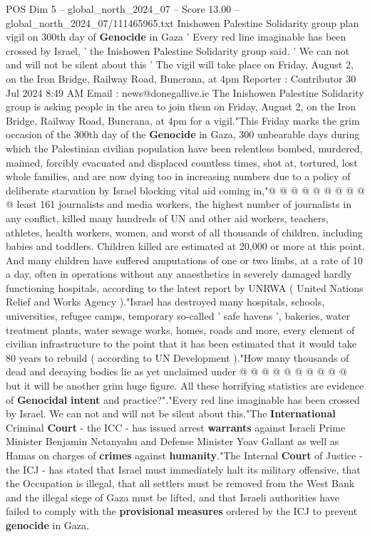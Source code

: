 \begin{textsample}{POS Dim 5 – global\_north\_2024\_07 – Score 13.00 – global\_north\_2024\_07/111465965.txt}  \label{ex:f5_pos_306}
Inishowen Palestine Solidarity group plan vigil on 300th day of \textbf{Genocide} in Gaza ' Every red line imaginable has been crossed by Israel, ' the Inishowen Palestine Solidarity group said. ' We can not and will not be silent about this ' The vigil will take place on Friday, August 2, on the Iron Bridge, Railway Road, Buncrana, at 4pm Reporter : Contributor 30 Jul 2024 8:49 AM Email : news@donegallive.ie The Inishowen Palestine Solidarity group is asking people in the area to join them on Friday, August 2, on the Iron Bridge, Railway Road, Buncrana, at 4pm for a vigil."This Friday marks the grim occasion of the 300th day of the \textbf{Genocide} in Gaza, 300 unbearable days during which the Palestinian civilian population have been relentless bombed, murdered, maimed, forcibly evacuated and displaced countless times, shot at, tortured, lost whole families, and are now dying too in increasing numbers due to a policy of deliberate starvation by Israel blocking vital aid coming in,"@ @ @ @ @ @ @ @ @ @ least 161 journalists and media workers, the highest number of journalists in any conflict, killed many hundreds of UN and other aid workers, teachers, athletes, health workers, women, and worst of all thousands of children, including babies and toddlers.
Children killed are estimated at 20,000 or more at this point.
And many children have suffered amputations of one or two limbs, at a rate of 10 a day, often in operations without any anaesthetics in severely damaged hardly functioning hospitals, according to the latest report by UNRWA ( United Nations Relief and Works Agency )."Israel has destroyed many hospitals, schools, universities, refugee camps, temporary so-called ' safe havens ', bakeries, water treatment plants, water sewage works, homes, roads and more, every element of civilian infrastructure to the point that it has been estimated that it would take 80 years to rebuild ( according to UN Development )."How many thousands of dead and decaying bodies lie as yet unclaimed under @ @ @ @ @ @ @ @ @ @ but it will be another grim huge figure.
All these horrifying statistics are evidence of \textbf{Genocidal} \textbf{intent} and practice?"."Every red line imaginable has been crossed by Israel.
We can not and will not be silent about this."The \textbf{International} Criminal \textbf{Court} - the ICC - has issued arrest \textbf{warrants} against Israeli Prime Minister Benjamin Netanyahu and Defense Minister Yoav Gallant as well as Hamas on charges of \textbf{crimes} against \textbf{humanity}."The Internal \textbf{Court} of Justice - the ICJ - has stated that Israel must immediately halt its military offensive, that the Occupation is illegal, that all settlers must be removed from the West Bank and the illegal siege of Gaza must be lifted, and that Israeli authorities have failed to comply with the \textbf{provisional} \textbf{measures} ordered by the ICJ to prevent \textbf{genocide} in Gaza.

\end{textsample}
